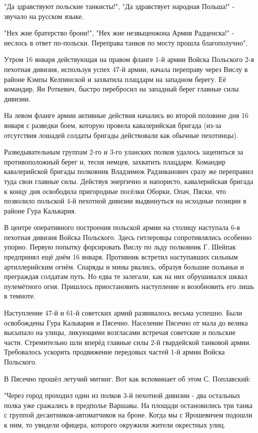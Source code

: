 "Да здравствуют польские танкисты!", "Да здравствует народная Польша!" - звучало на русском языке. 

"Нех жие братерство брони!", "Нех жие незвыценжона Армия Радценска!" - неслось
в ответ по-польски. Переправа танков по мосту прошла благополучно". 

Утром 16 января действующая на правом фланге 1-й армии Войска Польского 2-я
пехотная дивизия, используя успех 47-й армии, начала переправу через Вислу в
районе Кэмпы Келпинской и захватила плацдарм на западном берегу. Её командир,
Ян Роткевич, быстро перебросил на западный берег главные силы дивизии. 

На левом фланге армии активные действия начались во второй половине дня 16
января с разведки боем, которую провела кавалерийская бригада (из-за отсутствия
лошадей солдаты бригады действовали как обычные пехотинцы). 

Разведывательным группам 2-го и 3-го уланских полков удалось зацепиться за
противоположный берег и, тесня немцев, захватить плацдарм. Командир
кавалерийской бригады полковник Владзимеж Радзиванович сразу же переправил туда
свои главные силы. Действуя энергично и напористо, кавалерийская бригада к
концу дня освободила пригородные посёлки Оборки, Опач, Пяски, что позволило
польской 4-й пехотной дивизии выдвинуться на исходные позиции в районе Гура
Кальвария. 

В центре оперативного построения польской армии на столицу наступала 6-я
пехотная дивизия Войска Польского. Здесь гитлеровцы сопротивлялись особенно
упорно. Первую попытку форсировать Вислу по льду полковник Г. Шейпак предпринял
ещё днём 16 января. Противник встретил наступавших сильным артиллерийским
огнём. Снаряды и мины рвались, образуя большие полыньи и преграждая солдатам
путь. Но едва те залегали, как на них обрушивался шквал пулемётного огня.
Пришлось приостановить наступление и возобновить его лишь в темноте. 

Наступление 47-й и 61-й советских армий развивалось весьма успешно. Были
освобождены Гура Кальвария и Пясечно. Население Пясечно от мала до велика
высыпало на улицы, ликующими возгласами встречая советские и польские части.
Стремительно шли вперёд главные силы 2-й гвардейской танковой армии.
Требовалось ускорить продвижение передовых частей 1-й армии Войска Польского. 

В Пясечно прошёл летучий митинг. Вот как вспоминает об этом С. Поплавский: 

"Через город проходил один из полков 3-й пехотной дивизии - два остальных полка
уже сражались в предполье Варшавы. На площади остановились три танка с группой
десантников-автоматчиков на броне. Когда мы с Ярошевичем подошли к ним, то
увидели офицера, которого окружили жители окрестных улиц. 

